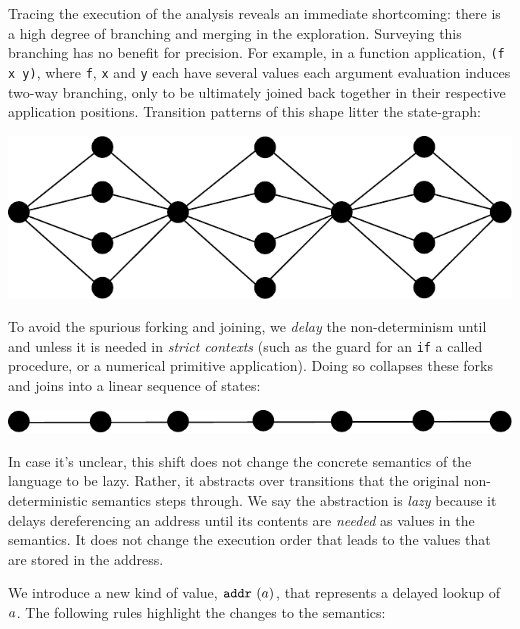 \documentclass[preprint,onecolumn,9pt]{sigplanconf} %
\begin{document}
Tracing the execution of the analysis reveals an immediate shortcoming:
there is a high degree of branching and merging in the exploration.
%
Surveying this branching has no benefit for precision.
%
For example, in a function application, {\tt (f x y)},
where {\tt f}, {\tt x} and {\tt y} each have several values
each argument evaluation induces two-way branching, only to be ultimately joined back together in their respective
application positions. 
%
Transition patterns of this shape litter the state-graph:
%
\begin{center}
\includegraphics[scale=0.3]{fanout.pdf}
\end{center}
To avoid the spurious forking and joining, we {\it delay} the non-determinism
until and unless it is needed in {\it strict contexts} (such as the guard for an
{\tt if} a called procedure, or a numerical primitive application). 
%
Doing so collapses these forks and joins into a linear sequence of states:
\begin{center}
\includegraphics[scale=0.3]{lazy.pdf}
\end{center}

In case it's unclear, this shift does not change the concrete semantics of the
language to be lazy.  Rather, it abstracts over transitions that the original
non-deterministic semantics steps through. 
%
We say the abstraction is \emph{lazy} because it delays dereferencing an
address until its contents are \emph{needed} as values in the semantics. It
does not change the execution order that leads to the values that are stored in
the address.

We introduce a new kind of value, ${\tt addr{\ }}({a})$, that represents a
delayed lookup of $a$.  The following rules highlight the
changes to the semantics:

\renewcommand{\ext}{\mathit{ext}}
\end{document}
